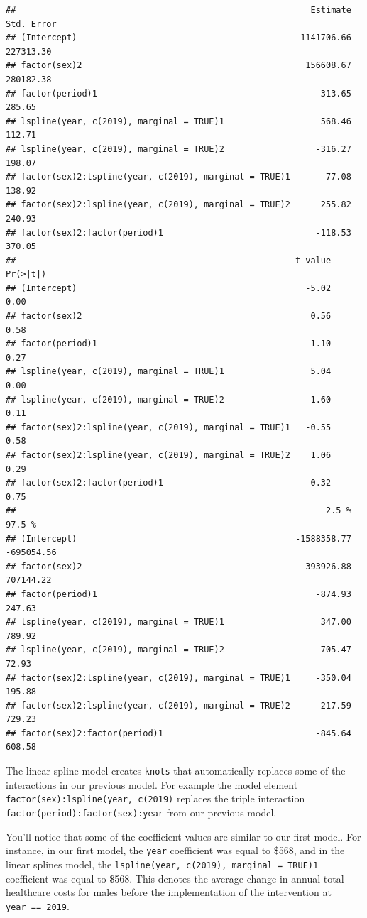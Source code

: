 \documentclass[
]{book}
\begin{document}
\begin{verbatim}
##                                                          Estimate Std. Error
## (Intercept)                                           -1141706.66  227313.30
## factor(sex)2                                            156608.67  280182.38
## factor(period)1                                           -313.65     285.65
## lspline(year, c(2019), marginal = TRUE)1                   568.46     112.71
## lspline(year, c(2019), marginal = TRUE)2                  -316.27     198.07
## factor(sex)2:lspline(year, c(2019), marginal = TRUE)1      -77.08     138.92
## factor(sex)2:lspline(year, c(2019), marginal = TRUE)2      255.82     240.93
## factor(sex)2:factor(period)1                              -118.53     370.05
##                                                       t value Pr(>|t|)
## (Intercept)                                             -5.02     0.00
## factor(sex)2                                             0.56     0.58
## factor(period)1                                         -1.10     0.27
## lspline(year, c(2019), marginal = TRUE)1                 5.04     0.00
## lspline(year, c(2019), marginal = TRUE)2                -1.60     0.11
## factor(sex)2:lspline(year, c(2019), marginal = TRUE)1   -0.55     0.58
## factor(sex)2:lspline(year, c(2019), marginal = TRUE)2    1.06     0.29
## factor(sex)2:factor(period)1                            -0.32     0.75
##                                                             2.5 %     97.5 %
## (Intercept)                                           -1588358.77 -695054.56
## factor(sex)2                                           -393926.88  707144.22
## factor(period)1                                           -874.93     247.63
## lspline(year, c(2019), marginal = TRUE)1                   347.00     789.92
## lspline(year, c(2019), marginal = TRUE)2                  -705.47      72.93
## factor(sex)2:lspline(year, c(2019), marginal = TRUE)1     -350.04     195.88
## factor(sex)2:lspline(year, c(2019), marginal = TRUE)2     -217.59     729.23
## factor(sex)2:factor(period)1                              -845.64     608.58
\end{verbatim}

The linear spline model creates \texttt{knots} that automatically replaces some of the interactions in our previous model. For example the model element \texttt{factor(sex):lspline(year,\ c(2019)} replaces the triple interaction \texttt{factor(period):factor(sex):year} from our previous model.

You'll notice that some of the coefficient values are similar to our first model. For instance, in our first model, the \texttt{year} coefficient was equal to \$568, and in the linear splines model, the \texttt{lspline(year,\ c(2019),\ marginal\ =\ TRUE)1} coefficient was equal to \$568. This denotes the average change in annual total healthcare costs for males before the implementation of the intervention at \texttt{year\ ==\ 2019}.
\end{document}
